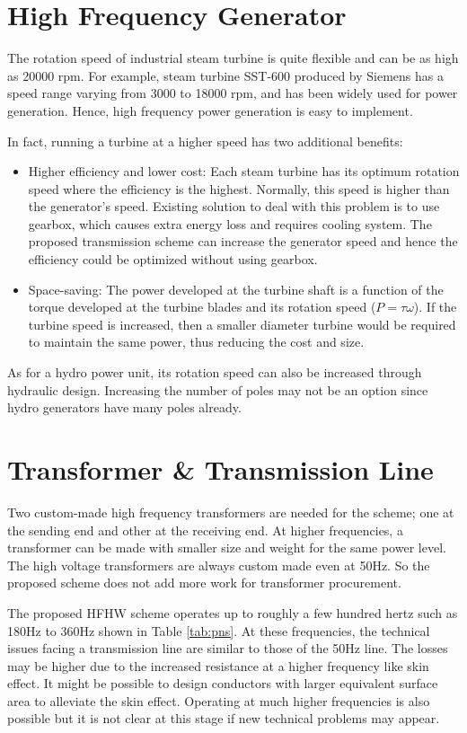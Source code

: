 \documentclass[12pt,a4paper]{reportmod}
\begin{document}
\section{High Frequency Generator}
\par The rotation speed of industrial steam turbine is quite flexible and can be as high as 20000 rpm. For example, steam turbine SST-600 produced by Siemens has a speed range varying from 3000 to 18000 rpm, and has been widely used for power generation. Hence, high frequency power generation is easy to implement.
\par In fact, running a turbine at a higher speed has two additional benefits: 
\begin{itemize}
\item Higher efficiency and lower cost: Each steam turbine has its optimum rotation speed where the efficiency is the highest. Normally, this speed is higher than the generator's speed. Existing solution to deal with this problem is to use gearbox, which causes extra energy loss and requires cooling system. The proposed transmission scheme can increase the generator speed and hence the efficiency could be optimized without using gearbox.
\item Space-saving: The power developed at the turbine shaft is a function of the torque developed at the turbine blades and its rotation speed ($P=\tau\omega$). If the turbine speed is increased, then a smaller diameter turbine would be required to maintain the same power, thus reducing the cost and size.
\end{itemize}
\par As for a hydro power unit, its rotation speed can also be increased through hydraulic design. Increasing the number of poles may not be an option since hydro generators have many poles already.
\section{Transformer \& Transmission Line}
\par Two custom-made high frequency transformers are needed for the scheme; one at the sending end and other at the receiving end. At higher frequencies, a transformer can be made with smaller size and weight for the same power level. The high voltage transformers are always custom made even at 50Hz. So the proposed scheme does not add more work for transformer procurement.
\par The proposed HFHW scheme operates up to roughly a few hundred hertz such as 180Hz to 360Hz shown in Table \ref{tab:pns}. At these frequencies, the technical issues facing a transmission line are similar to those of the 50Hz line. The losses may be higher due to the increased resistance at a higher frequency like skin effect. It might be possible to design conductors with larger equivalent surface area to alleviate the skin effect. Operating at much higher frequencies is also possible but it is not clear at this stage if new technical problems may appear.
\end{document}

